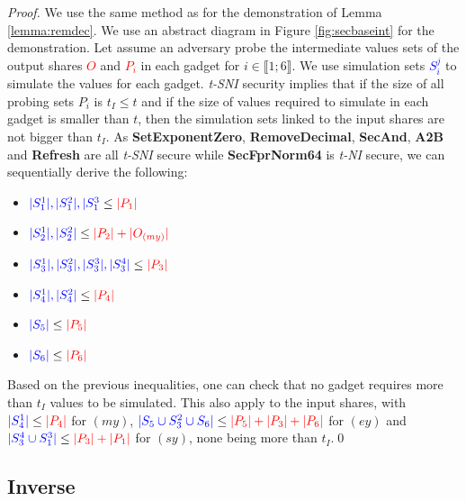 \documentclass[runningheads]{llncs}
\begin{document}
\begin{proof}
  We use the same method as for the demonstration of Lemma \ref{lemma:remdec}. We use an abstract diagram in Figure \ref{fig:secbaseint} for the demonstration. Let assume an adversary probe the intermediate values sets of the output shares \textcolor{red}{$O$} and \textcolor{red}{$P_i$} in each gadget for $i\in\llbracket 1;6 \rrbracket$. We use simulation sets \textcolor{blue}{$S_i^j$} to simulate the values for each gadget. \emph{t-SNI} security implies that if the size of all probing sets $P_i$ is $t_I\leq t$ and if the size of values required to simulate in each gadget is smaller than $t$, then the simulation sets linked to the input shares are not bigger than $t_I$. As \textbf{SetExponentZero}, \textbf{RemoveDecimal}, \textbf{SecAnd}, \textbf{A2B} and \textbf{Refresh} are all \emph{t-SNI} secure while \textbf{SecFprNorm64} is \emph{t-NI} secure, we can sequentially derive the following:
  \begin{multicols}{2}
    \begin{itemize}
      \item $\textcolor{blue}{|S_1^1|,|S_1^2|,|S_1^3} \leq \textcolor{red}{|P_1|}$
      \item $\textcolor{blue}{|S_2^1|,|S_2^2|} \leq \textcolor{red}{|P_2| +|O_{(my)}|} $
      \item $\textcolor{blue}{|S_3^1|,|S_3^2|,|S_3^3|,|S_3^4|} \leq \textcolor{red}{|P_3|}$
      \item $\textcolor{blue}{|S_4^1|,|S_4^2|} \leq \textcolor{red}{|P_4|}$
      \item $\textcolor{blue}{|S_5|} \leq \textcolor{red}{|P_5|}$
      \item $\textcolor{blue}{|S_6|} \leq \textcolor{red}{|P_6|}$
    \end{itemize}
  \end{multicols}
  Based on the previous inequalities, one can check that no gadget requires more than $t_I$ values to be simulated. This also apply to the input shares, with $\textcolor{blue}{|S_{4}^1|}\leq\textcolor{red}{|P_4|}$ for $(my)$, $\textcolor{blue}{|S_5 \cup S_3^2\cup S_6|}\leq\textcolor{red}{|P_5|+|P_3| + |P_6|}$ for $(ey)$ and $\textcolor{blue}{|S_3^4\cup S_1^3|}\leq\textcolor{red}{|P_3|+|P_1|}$ for $(sy)$, none being more than $t_I$.\hfill \qed
\end{proof}

\subsection{Inverse}
\end{document}
